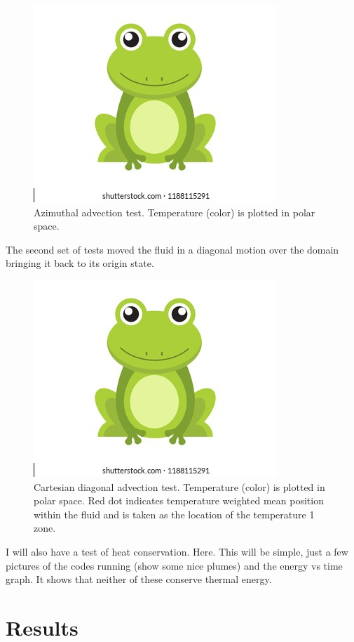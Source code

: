 \documentclass{article}
\begin{document}
\begin{figure}
	\centering
	\includegraphics{frog.png}
	\caption{Azimuthal advection test. Temperature (color) is plotted in polar space. }
\end{figure}

The second set of tests moved the fluid in a diagonal motion over the domain bringing it back to its origin state. 

\begin{figure}
	\centering 
	\includegraphics{frog.png}
	\caption{Cartesian diagonal advection test. Temperature (color) is plotted in polar space. Red dot indicates temperature weighted mean position within the fluid and is taken as the location of the temperature 1 zone.}
\end{figure}

I will also have a test of heat conservation. Here. This will be simple, just a few pictures of the codes running (show some nice plumes) and the energy vs time graph. It shows that neither of these conserve thermal energy.


\section*{Results}

\section*{}





\end{document}
